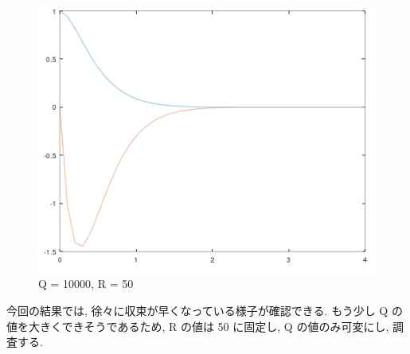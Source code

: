 \documentclass{jsarticle}
\begin{document}
\begin{figure}[h!]
\begin{minipage}{0.325\linewidth}
    \includegraphics[width=\linewidth]{./fig/q10000_r50.png}
    \caption{Q = 10000, R = 50}
  \end{minipage}
\end{figure}

今回の結果では, 徐々に収束が早くなっている様子が確認できる.
もう少し Q の値を大きくできそうである\hspace*{1zw}ため, R の値は 50 に固定し, Q の値のみ可変にし, 調査する.
\end{document}
